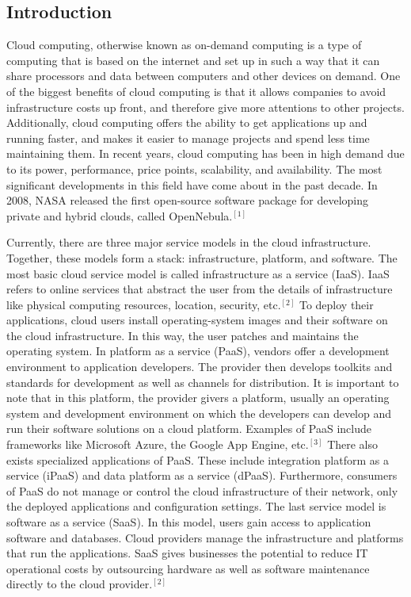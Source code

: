 \documentclass[a4paper, 8pt]{article} %
\begin{document}
\begin{doublespacing}

\section*{Introduction}


Cloud computing, otherwise known as on-demand computing is a type of computing that is based on the internet and set up in such a way that it can share processors and data between computers and other devices on demand.  One of the biggest benefits of cloud computing is that it allows companies to avoid infrastructure costs up front, and therefore give more attentions to other projects.  Additionally, cloud computing offers the ability to get applications up and running faster, and makes it easier to manage projects and spend less time maintaining them.  In recent years, cloud computing has been in high demand due to its power, performance, price points, scalability, and availability.  The most significant developments in this field have come about in the past decade.  In 2008, NASA released the first open-source software package for developing private and hybrid clouds, called OpenNebula.$^{[1]}$  

Currently, there are three major service models in the cloud infrastructure.  Together, these models form a stack: infrastructure, platform, and software.  The most basic cloud service model is called infrastructure as a service (IaaS).  IaaS refers to online services that abstract the user from the details of infrastructure like physical computing resources, location, security, etc.$^{[2]}$  To deploy their applications, cloud users install operating-system images and their software on the cloud infrastructure.  In this way, the user patches and maintains the operating system.  In platform as a service (PaaS), vendors offer a development environment to application developers.  The provider then develops toolkits and standards for development as well as channels for distribution.  It is important to note that in this platform, the provider givers a platform, usually an operating system and development environment on which the developers can develop and run their software solutions on a cloud platform.  Examples of PaaS include frameworks like Microsoft Azure, the Google App Engine, etc.$^{[3]}$  There also exists specialized applications of PaaS.  These include integration platform as a service (iPaaS) and data platform as a service (dPaaS).  Furthermore, consumers of PaaS do not manage or control the cloud infrastructure of their network, only the deployed applications and configuration settings.  The last service model is software as a service (SaaS).  In this model, users gain access to application software and databases.  Cloud providers manage the infrastructure and platforms that run the applications.  SaaS gives businesses the potential to reduce IT operational costs by outsourcing hardware as well as software maintenance directly to the cloud provider.$^{[2]}$  


\end{doublespacing}
\end{document}
